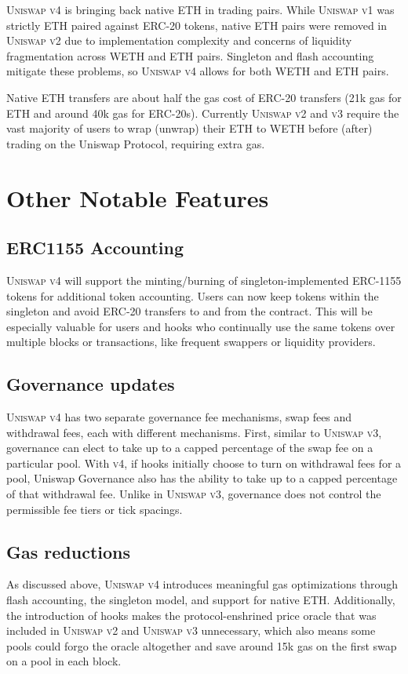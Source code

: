 \documentclass[sigconf,nonacm,prologue,table]{acmart}
\numberwithin{equation}{section}
\theoremstyle{definition}
\theoremstyle{remark}
\begin{document}
\textsc{Uniswap v4} is bringing back native ETH in trading pairs. While \textsc{Uniswap v1} was strictly ETH paired against ERC-20 tokens, native ETH pairs were removed in \textsc{Uniswap v2} due to implementation complexity and concerns of liquidity fragmentation across WETH and ETH pairs. Singleton and flash accounting mitigate these problems, so \textsc{Uniswap v4} allows for both WETH and ETH pairs.

Native ETH transfers are about half the gas cost of ERC-20 transfers (21k gas for ETH and around 40k gas for ERC-20s). Currently \textsc{Uniswap v2} and \textsc{v3} require the vast majority of users to wrap (unwrap) their ETH to WETH before (after) trading on the Uniswap Protocol, requiring extra gas. 

\section{Other Notable Features} 
\label{other}

\subsection{ERC1155 Accounting} 
\textsc{Uniswap v4} will support the minting/burning of singleton-implemented ERC-1155 tokens for additional token accounting. Users can now keep tokens within the singleton and avoid ERC-20 transfers to and from the contract. This will be especially valuable for users and hooks who continually use the same tokens over multiple blocks or transactions, like frequent swappers or liquidity providers. 

\subsection{Governance updates} 
\textsc{Uniswap v4} has two separate governance fee mechanisms, swap fees and withdrawal fees, each with different mechanisms. First, similar to \textsc{Uniswap v3}, governance can elect to take  up to a capped percentage of the swap fee on a particular pool. With \textsc{v4}, if hooks initially choose to turn on withdrawal fees for a pool, Uniswap Governance also has the ability to take up to a capped percentage of that withdrawal fee.
Unlike in \textsc{Uniswap v3}, governance does not control the permissible fee tiers or tick spacings.

\subsection{Gas reductions}
As discussed above, \textsc{Uniswap v4} introduces meaningful gas optimizations through flash accounting, the singleton model, and support for native ETH. Additionally, the introduction of hooks makes the protocol-enshrined price oracle that was included in \textsc{Uniswap v2} and \textsc{Uniswap v3} unnecessary, which also means some pools could forgo the oracle altogether and save around 15k gas on the first swap on a pool in each block. 
\end{document}
